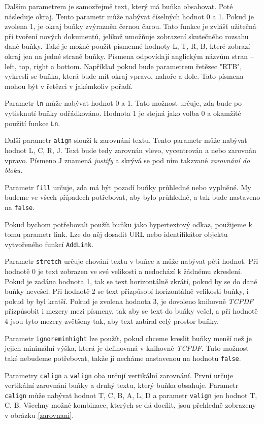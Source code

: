 \documentclass[czech,BP]{thesiskiv}
\begin{document}
Dalším parametrem je samozřejmě text, který má buňka obsahovat. Poté následuje okraj. Tento parametr může nabývat číselných hodnot 0 a 1. Pokud je zvolena 1, je okraj buňky zvýrazněn černou čarou. Tato funkce je zvlášť užitečná při tvoření nových dokumentů, jelikož umožňuje zobrazení skutečného rozsahu dané buňky. Také je možné použít písmenné hodnoty L, T, R, B, které zobrazí okraj jen na jedné straně buňky. Písmena odpovídají anglickým názvům stran -- left, top, right a bottom. Například pokud bude parametrem řetězec "RTB", vykreslí se buňka, která bude mít okraj vpravo, nahoře a dole. Tato písmena mohou být v řetězci v jakémkoliv pořadí.

Parametr \texttt{ln} může nabývat hodnot 0 a 1. Tato možnost určuje, zda bude po vytisknutí buňky odřádkováno. Hodnota 1 je stejná jako volba 0 a okamžité použití funkce \texttt{Ln}. 

Další parametr \texttt{align} slouží k zarovnání textu. Tento parametr může nabývat hodnot L, C, R, J. Text bude tedy zarovnán vlevo, vycentrován a nebo zarovnán vpravo. Písmeno J znamená \emph{justify} a skrývá se pod ním takzvané \emph{zarovnání do bloku}. 

Parametr \texttt{fill} určuje, zda má být pozadí buňky průhledné nebo vyplněné. My budeme ve všech případech potřebovat, aby bylo průhledné, a tak bude nastaveno na \texttt{false}.

Pokud bychom potřebovali použít buňku jako hypertextový odkaz, použijeme k tomu parametr link. Lze do něj dosadit URL nebo identifikátor objektu vytvořeného funkcí \texttt{AddLink}.

Parametr \texttt{stretch} určuje chování textu v buňce a může nabývat pěti hodnot. Při hodnotě 0 je text zobrazen ve své velikosti a nedochází k žádnému zkreslení. Pokud je zadána hodnota 1, tak se text horizontálně zkrátí, pokud by se do dané buňky nevešel. Při hodnotě 2 se text přizpůsobí horizontálně velikosti buňky, i pokud by byl kratší. Pokud je zvolena hodnota 3, je dovoleno knihovně \emph{TCPDF} přizpůsobit i mezery mezi písmeny, tak aby se text do buňky vešel, a při hodnotě 4 jsou tyto mezery zvětšeny tak, aby text zabíral celý prostor buňky. 

Parametr \texttt{ignore\textunderscore min\textunderscore hight} lze použít, pokud chceme kreslit buňky menší než je jejich minimální výška, která je definovaná v knihovně \emph{TCPDF}. Tuto možnost také nebudeme potřebovat, takže ji necháme nastavenou na hodnotu \texttt{false}.

Parametry \texttt{calign} a \texttt{valign} oba určují vertikální zarovnání. První určuje vertikální zarovnání buňky a druhý textu, který buňka obsahuje. Parametr \texttt{calign} může nabývat hodnot T, C, B, A, L, D a parametr \texttt{valign} jen hodnot T, C, B. Všechny možné kombinace, kterých se dá docílit, jsou přehledně zobrazeny v obrázku \ref{zarovnani}. 
\end{document}
